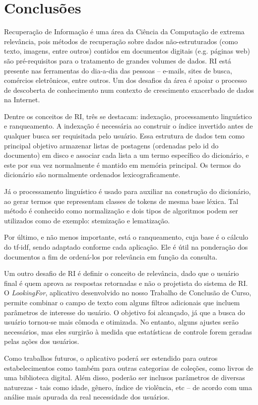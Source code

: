 \chapter{Conclusões}
\label{cap:conclusoes}

Recuperação de Informação é uma área da Ciência da Computação de extrema relevância, pois métodos de recuperação sobre dados não-estruturados (como texto, imagens, entre outros) contidos em documentos digitais (e.g. páginas web) são pré-requisitos para o tratamento de grandes volumes de dados. RI está presente nas ferramentas do dia-a-dia das pessoas – e-mails, sites de busca, comércios eletrônicos, entre outros. Um dos desafios da área é apoiar o processo de descoberta de conhecimento num contexto de crescimento exacerbado de dados na Internet.

Dentre os conceitos de RI, três se destacam: indexação, processamento linguístico e ranqueamento. A indexação é necessária ao construir o índice invertido antes de qualquer busca ser requisitada pelo usuário. Essa estrutura de dados tem como principal objetivo armazenar listas de postagens (ordenadas pelo id do documento) em disco e associar cada lista a um termo específico do dicionário, e este por sua vez normalmente é mantido em memória principal. Os termos do dicionário são normalmente ordenados lexicograficamente.

Já o processamento linguístico é usado para auxiliar na construção do dicionário, ao gerar termos que representam classes de tokens de mesma base léxica. Tal método é conhecido como normalização e dois tipos de algoritmos podem ser utilizados como de exemplo: stemização e lematização.

Por último, e não menos importante, está o ranqueamento, cuja base é o cálculo do tf-idf, sendo adaptado conforme cada aplicação. Ele é útil na ponderação dos documentos a fim de ordená-los por relevância em função da consulta.

Um outro desafio de RI é definir o conceito de relevância, dado que o usuário final é quem aprova as respostas retornadas e não o projetista do sistema de RI. O \emph{LookingFor}, aplicativo desenvolvido no nosso Trabalho de Conclusão de Curso, permite combinar o campo de texto com alguns filtros adicionais que incluem parâmetros de interesse do usuário. O objetivo foi alcançado, já que a busca do usuário tornou-se mais cômoda e otimizada. No entanto, alguns ajustes serão necessários, mas eles surgirão à medida que estatísticas de controle forem geradas pelas ações dos usuários.

Como trabalhos futuros, o aplicativo poderá ser estendido para outros estabelecimentos como também para outras categorias de coleções, como livros de uma biblioteca digital. Além disso, poderão ser inclusos parâmetros de diversas naturezas - tais como idade, gênero, índice de violência, etc – de acordo com uma análise mais apurada da real necessidade dos usuários.